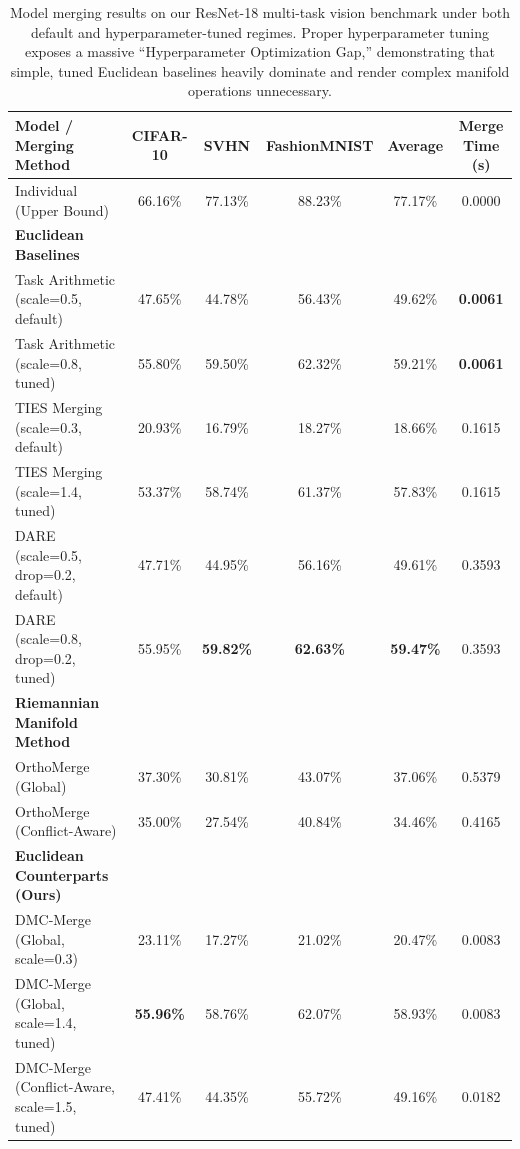 \documentclass{article}
\begin{document}
\begin{table}[t]
\caption{Model merging results on our ResNet-18 multi-task vision benchmark under both default and hyperparameter-tuned regimes. Proper hyperparameter tuning exposes a massive ``Hyperparameter Optimization Gap,'' demonstrating that simple, tuned Euclidean baselines heavily dominate and render complex manifold operations unnecessary.}
\label{tab:results}
\vskip 0.15in
\begin{center}
\begin{small}
\begin{tabular}{lccccc}
\toprule
\textbf{Model / Merging Method} & \textbf{CIFAR-10} & \textbf{SVHN} & \textbf{FashionMNIST} & \textbf{Average} & \textbf{Merge Time (s)} \\
\midrule
Individual (Upper Bound) & 66.16\% & 77.13\% & 88.23\% & 77.17\% & 0.0000 \\
\midrule
\textbf{Euclidean Baselines} & & & & & \\
Task Arithmetic (scale=0.5, default) & 47.65\% & 44.78\% & 56.43\% & 49.62\% & \textbf{0.0061} \\
Task Arithmetic (scale=0.8, tuned) & 55.80\% & 59.50\% & 62.32\% & 59.21\% & \textbf{0.0061} \\
TIES Merging (scale=0.3, default) & 20.93\% & 16.79\% & 18.27\% & 18.66\% & 0.1615 \\
TIES Merging (scale=1.4, tuned) & 53.37\% & 58.74\% & 61.37\% & 57.83\% & 0.1615 \\
DARE (scale=0.5, drop=0.2, default) & 47.71\% & 44.95\% & 56.16\% & 49.61\% & 0.3593 \\
DARE (scale=0.8, drop=0.2, tuned) & 55.95\% & \textbf{59.82\%} & \textbf{62.63\%} & \textbf{59.47\%} & 0.3593 \\
\midrule
\textbf{Riemannian Manifold Method} & & & & & \\
OrthoMerge (Global) & 37.30\% & 30.81\% & 43.07\% & 37.06\% & 0.5379 \\
OrthoMerge (Conflict-Aware) & 35.00\% & 27.54\% & 40.84\% & 34.46\% & 0.4165 \\
\midrule
\textbf{Euclidean Counterparts (Ours)} & & & & & \\
DMC-Merge (Global, scale=0.3) & 23.11\% & 17.27\% & 21.02\% & 20.47\% & 0.0083 \\
DMC-Merge (Global, scale=1.4, tuned) & \textbf{55.96\%} & 58.76\% & 62.07\% & 58.93\% & 0.0083 \\
DMC-Merge (Conflict-Aware, scale=1.5, tuned) & 47.41\% & 44.35\% & 55.72\% & 49.16\% & 0.0182 \\
\bottomrule
\end{tabular}
\end{small}
\end{center}
\vskip -0.1in
\end{table}
\end{document}
